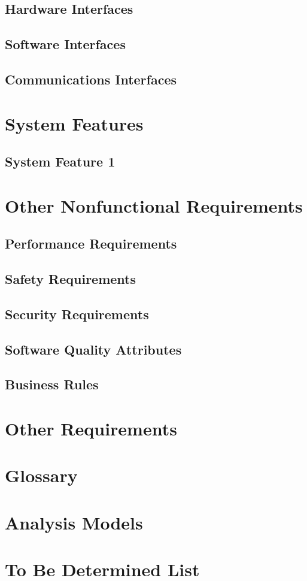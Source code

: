 \section{Hardware Interfaces}
\section{Software Interfaces}
\section{Communications Interfaces}


\chapter{System Features}
\label{System Features}

\section{System Feature 1}


\chapter{Other Nonfunctional Requirements}
\label{Other Nonfunctional Requirements}

\section{Performance Requirements}
\section{Safety Requirements}
\section{Security Requirements}
\section{Software Quality Attributes}
\section{Business Rules}

\chapter{Other Requirements}
\label{Other Requirements}

\begin{appendices}
\chapter{Glossary}
\chapter{Analysis Models}
\chapter{To Be Determined List}


\end{appendices}


